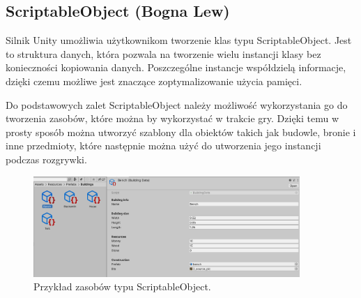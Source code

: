 \subsection{ScriptableObject (Bogna Lew)}\label{ss:so}
Silnik Unity umożliwia użytkownikom tworzenie klas typu ScriptableObject. Jest to struktura danych, która pozwala na
tworzenie wielu instancji klasy bez konieczności kopiowania danych. Poszczególne instancje współdzielą informacje, dzięki
czemu możliwe jest znaczące zoptymalizowanie użycia pamięci.

Do podstawowych zalet ScriptableObject należy możliwość wykorzystania go do tworzenia zasobów, które można by wykorzystać
w trakcie gry. Dzięki temu w prosty sposób można utworzyć szablony dla obiektów takich jak budowle, bronie i inne
przedmioty, które następnie można użyć do utworzenia jego instancji podczas rozgrywki.

\begin{figure}[h!]
    \centering
    \includegraphics[width=0.9\textwidth]{images/scriptableobjects.jpg}
    \caption{Przykład zasobów typu ScriptableObject.}
\end{figure}
\FloatBarrier
